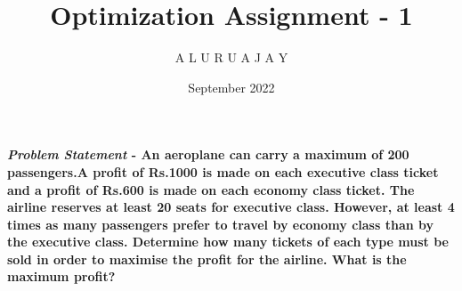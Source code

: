 \documentclass[10pt,twocolumn]{article}
\title{\textbf{Optimization Assignment - 1}}
\author{A L U R U A J A Y}
\date{September 2022}
\begin{document}
\maketitle
\paragraph{\textit{Problem Statement} -
An aeroplane can carry a maximum of 200 passengers.A profit of Rs.1000 is made on each executive class ticket and a profit of Rs.600 is made on each economy class ticket. The airline reserves at least 20 seats for executive class. However, at least 4 times as many passengers prefer to travel by economy class than by the executive class. Determine how many tickets of each type must be sold in order to maximise the profit for the airline. What is the maximum profit? 
\fi
\iffalse
}
\end{document}
